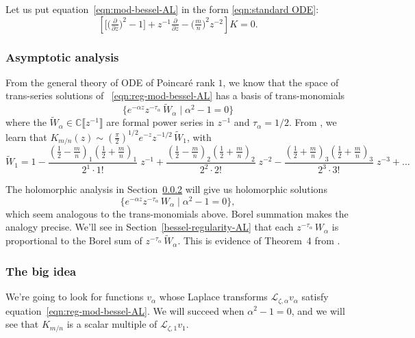 \documentclass{article}
\newcommand{\C}{\mathbb{C}}
\newcommand{\series}[1]{\tilde{#1}}
\newcommand{\laplace}{\mathcal{L}}
\theoremstyle{definition}
\theoremstyle{plain}
\begin{document}
Let us put equation~\eqref{eqn:mod-bessel-AL} in the form \eqref{eqn:standard ODE}:
\begin{equation}\label{eqn:reg-mod-bessel-AL}
\left[ \big[ \big(\tfrac{\partial}{\partial z}\big)^2 - 1 \big] + z^{-1} \tfrac{\partial}{\partial z} - \big({\tfrac{m}{n}}\big)^2 z^{-2} \right] K = 0.
\end{equation}

\subsubsection{Asymptotic analysis}\label{sec:asympt-AL}

From the general theory of ODE of Poincar\'e rank $1$, we know that the space of trans-series solutions of ~\eqref{eqn:reg-mod-bessel-AL} has a basis of trans-monomials
\[ \{ e^{-\alpha z} z^{-\tau_\alpha}\,\series{W}_\alpha \mid \alpha^2 - 1 = 0 \} \]
where the $\series{W}_\alpha\in\C\llbracket z^{-1} \rrbracket$ are formal power series in $z^{-1}$ and $\tau_\alpha=1/2$. From \cite[Equations 10.40.2 and 10.17.1]{dlmf}, we learn that $K_{m/n}(z) \sim \left(\tfrac{\pi}{2}\right)^{1/2} e^{-z} z^{-1/2}\,\series{W}_1$, with
\begin{equation}\label{bessel-asymp-AL}
\series{W}_1 = 1 - \frac{(\tfrac{1}{2}-\tfrac{m}{n})_1 (\tfrac{1}{2}+\frac{m}{n})_1}{2^1 \cdot 1!}\;z^{-1} + \frac{(\tfrac{1}{2}-\tfrac{m}{n})_2 (\tfrac{1}{2}+\tfrac{m}{n})_2}{2^2 \cdot 2!}\;z^{-2} - \frac{(\tfrac{1}{2}+\tfrac{m}{n})_3 (\tfrac{1}{2}+\tfrac{m}{n})_3}{2^3 \cdot 3!}\;z^{-3} + \ldots
\end{equation}

The holomorphic analysis in Section~\ref{big-idea} will give us holomorphic solutions
\[ \{ e^{-\alpha z} z^{-\tau_\alpha}\,W_\alpha \mid \alpha^2 - 1 = 0 \}, \]
which seem analogous to the trans-monomials above. Borel summation makes the analogy precise. We’ll see in Section~\ref{bessel-regularity-AL} that each $z^{-\tau_\alpha}\,W_\alpha$ is proportional to the Borel sum of $z^{-\tau_\alpha}\,\series{W}_\alpha$. This is evidence of Theorem~4 from \cite{reg-sing-volterra}.
\subsubsection{The big idea}\label{big-idea}
We're going to look for functions $v_\alpha$ whose Laplace transforms $\laplace_{\zeta, \alpha} v_\alpha$ satisfy equation~\eqref{eqn:reg-mod-bessel-AL}. We will succeed when $\alpha^2 - 1 = 0$, and we will see that $K_{m/n}$ is a scalar multiple of $\laplace_{\zeta, 1} v_1$.
\end{document}
